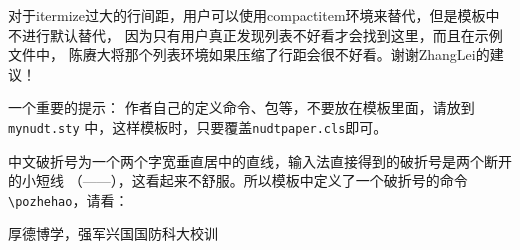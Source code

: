 对于itermize过大的行间距，用户可以使用compactitem环境来替代，但是模板中不进行默认替代，
因为只有用户真正发现列表不好看才会找到这里，而且在示例文件中，
陈赓大将那个列表环境如果压缩了行距会很不好看。谢谢ZhangLei的建议！

{\hei 一个重要的提示：}
作者自己的定义命令、包等，不要放在模板里面，请放到\verb|mynudt.sty|
中，这样模板时，只要覆盖\verb|nudtpaper.cls|即可。

中文破折号为一个两个字宽垂直居中的直线，输入法直接得到的破折号是两个断开的小短线
（——），这看起来不舒服。所以模板中定义了一个破折号的命令 \verb|\pozhehao|，请看：

厚德博学，强军兴国\hfill \pozhehao{}国防科大校训

